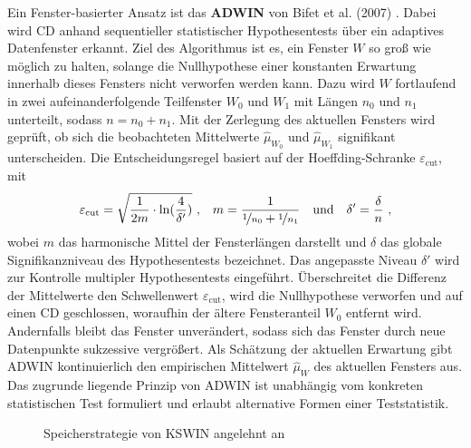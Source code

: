 Ein Fenster-basierter Ansatz ist das \textbf{\ac{ADWIN}} von Bifet et al. (2007) \cite{bifet.2007}. Dabei wird \ac{CD} anhand sequentieller statistischer Hypothesentests über ein adaptives Datenfenster erkannt. Ziel des Algorithmus ist es, ein Fenster $W$ so groß wie möglich zu halten, solange die Nullhypothese einer konstanten Erwartung innerhalb dieses Fensters nicht verworfen werden kann. Dazu wird $W$ fortlaufend in zwei aufeinanderfolgende Teilfenster $W_0$ und $W_1$ mit Längen $n_0$ und $n_1$ unterteilt, sodass $n = n_0 + n_1$. Mit der Zerlegung des aktuellen Fensters wird geprüft, ob sich die beobachteten Mittelwerte $\hat{\mu}_{W_0}$ und $\hat{\mu}_{W_1}$ signifikant unterscheiden. Die Entscheidungsregel basiert auf der Hoeffding-Schranke $\varepsilon_{\mathrm{cut}}$, mit 
%
\begin{equation} \label{eq:adwin_threshold}
    \varepsilon_{\mathrm{cut}} = \sqrt{\frac{1}{2m} \cdot \ln(\frac{4}{\delta'})} \ \text{,} \quad m = \frac{1}{\nicefrac{1}{n_0} + \nicefrac{1}{n_1}} \quad \text{und} \quad \delta'=\frac{\delta}{n} \ \text{,}
\end{equation}
%
wobei $m$ das harmonische Mittel der Fensterlängen darstellt und $\delta$ das globale Signifikanzniveau des Hypothesentests bezeichnet. Das angepasste Niveau $\delta'$ wird zur Kontrolle multipler Hypothesentests eingeführt. Überschreitet die Differenz der Mittelwerte den Schwellenwert $\varepsilon_{\mathrm{cut}}$, wird die Nullhypothese verworfen und auf einen \ac{CD} geschlossen, woraufhin der ältere Fensteranteil $W_0$ entfernt wird. Andernfalls bleibt das Fenster unverändert, sodass sich das Fenster durch neue Datenpunkte sukzessive vergrößert. Als Schätzung der aktuellen Erwartung gibt \ac{ADWIN} kontinuierlich den empirischen Mittelwert $\hat{\mu}_W$ des aktuellen Fensters aus. Das zugrunde liegende Prinzip von \ac{ADWIN} ist unabhängig vom konkreten statistischen Test formuliert und erlaubt alternative Formen einer Teststatistik. \par
%
\begin{figure}[hbt!]
    \centering
    
    \caption{Speicherstrategie von \ac{KSWIN} angelehnt an \cite{raab.2020}}
    \label{fig:KSWIN_memory}
\end{figure}
%
